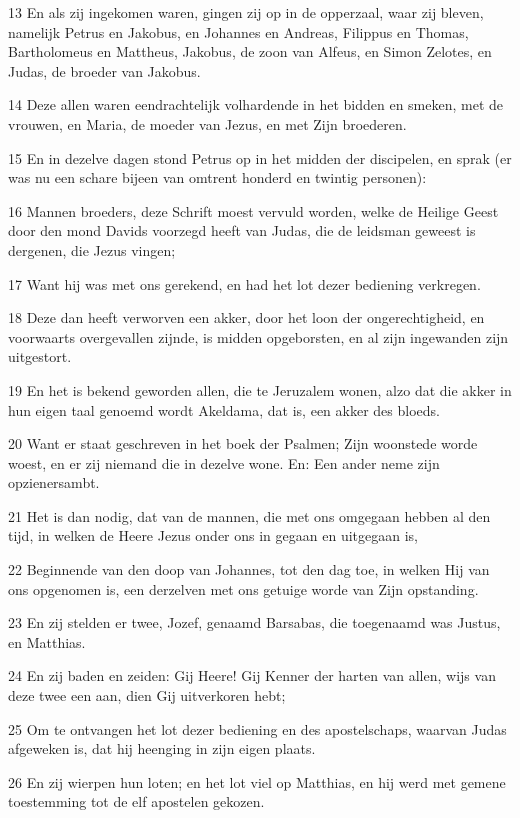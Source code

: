 \par 13 En als zij ingekomen waren, gingen zij op in de opperzaal, waar zij bleven, namelijk Petrus en Jakobus, en Johannes en Andreas, Filippus en Thomas, Bartholomeus en Mattheus, Jakobus, de zoon van Alfeus, en Simon Zelotes, en Judas, de broeder van Jakobus.
\par 14 Deze allen waren eendrachtelijk volhardende in het bidden en smeken, met de vrouwen, en Maria, de moeder van Jezus, en met Zijn broederen.
\par 15 En in dezelve dagen stond Petrus op in het midden der discipelen, en sprak (er was nu een schare bijeen van omtrent honderd en twintig personen):
\par 16 Mannen broeders, deze Schrift moest vervuld worden, welke de Heilige Geest door den mond Davids voorzegd heeft van Judas, die de leidsman geweest is dergenen, die Jezus vingen;
\par 17 Want hij was met ons gerekend, en had het lot dezer bediening verkregen.
\par 18 Deze dan heeft verworven een akker, door het loon der ongerechtigheid, en voorwaarts overgevallen zijnde, is midden opgeborsten, en al zijn ingewanden zijn uitgestort.
\par 19 En het is bekend geworden allen, die te Jeruzalem wonen, alzo dat die akker in hun eigen taal genoemd wordt Akeldama, dat is, een akker des bloeds.
\par 20 Want er staat geschreven in het boek der Psalmen; Zijn woonstede worde woest, en er zij niemand die in dezelve wone. En: Een ander neme zijn opzienersambt.
\par 21 Het is dan nodig, dat van de mannen, die met ons omgegaan hebben al den tijd, in welken de Heere Jezus onder ons in gegaan en uitgegaan is,
\par 22 Beginnende van den doop van Johannes, tot den dag toe, in welken Hij van ons opgenomen is, een derzelven met ons getuige worde van Zijn opstanding.
\par 23 En zij stelden er twee, Jozef, genaamd Barsabas, die toegenaamd was Justus, en Matthias.
\par 24 En zij baden en zeiden: Gij Heere! Gij Kenner der harten van allen, wijs van deze twee een aan, dien Gij uitverkoren hebt;
\par 25 Om te ontvangen het lot dezer bediening en des apostelschaps, waarvan Judas afgeweken is, dat hij heenging in zijn eigen plaats.
\par 26 En zij wierpen hun loten; en het lot viel op Matthias, en hij werd met gemene toestemming tot de elf apostelen gekozen.

